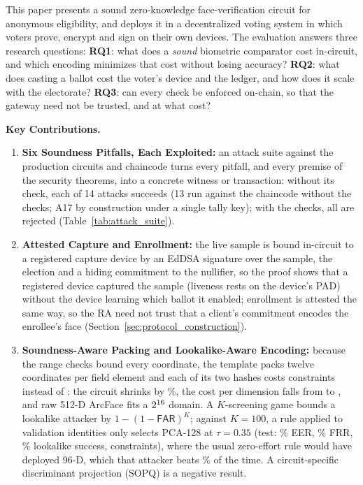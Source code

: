 \documentclass[10pt,letterpaper,journal]{IEEEtran}
\begin{document}
This paper presents a sound zero-knowledge face-verification circuit for anonymous eligibility, and deploys it in a decentralized voting system in which voters prove, encrypt and sign on their own devices. The evaluation answers three research questions:
\textbf{RQ1}: what does a \emph{sound} biometric comparator cost in-circuit, and which encoding minimizes that cost without losing accuracy?
\textbf{RQ2}: what does casting a ballot cost the voter's device and the ledger, and how does it scale with the electorate?
\textbf{RQ3}: can every check be enforced on-chain, so that the gateway need not be trusted, and at what cost?

\noindent\textbf{Key Contributions.}
\begin{enumerate}[leftmargin=*,noitemsep,topsep=1pt,parsep=0pt]
    \item \textbf{Six Soundness Pitfalls, Each Exploited:} an attack suite against the production circuits and chaincode turns every pitfall, and every premise of the security theorems, into a concrete witness or transaction: without its check, each of 14 attacks succeeds (13 run against the chaincode without the checks; A17 by construction under a single tally key); with the checks, all \nAttacks{} are rejected (Table~\ref{tab:attack_suite}).
    \item \textbf{Attested Capture and Enrollment:} the live sample is bound in-circuit to a registered capture device by an EdDSA signature over the sample, the election and a hiding commitment to the nullifier, so the proof shows that a registered device captured the sample (liveness rests on the device's PAD) without the device learning which ballot it enabled; enrollment is attested the same way, so the RA need not trust that a client's commitment encodes the enrollee's face (Section~\ref{sec:protocol_construction}).
    \item \textbf{Soundness-Aware Packing and Lookalike-Aware Encoding:} because the range checks bound every coordinate, the template packs twelve coordinates per field element and each of its two hashes costs \nHashConstraints{} constraints instead of \nChunkedHash{}: the circuit shrinks by \nPackSave\%, the cost per dimension falls from \nChunkedPerDim{} to \nPerDim{}, and raw 512-D ArcFace fits a $2^{16}$ domain. A $K$-screening game bounds a lookalike attacker by $1-(1-\mathsf{FAR})^K$; against $K = 100$, a rule applied to validation identities only selects PCA-128 at $\tau = 0.35$ (test: \nLfwEer\% EER, \nFrr\% FRR, \nLookLfwHundred\% lookalike success, \nFaceConstraints{} constraints), where the usual zero-effort rule would have deployed 96-D, which that attacker beats \nZeLookLfwHundred\% of the time. A circuit-specific discriminant projection (SOPQ) is a negative result.

\end{enumerate}
\end{document}
